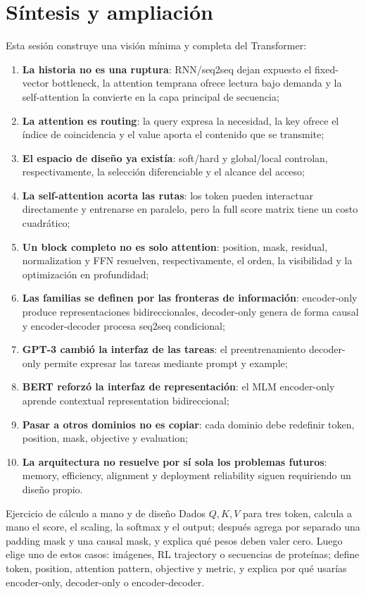 \section{Síntesis y ampliación}

Esta sesión construye una visión mínima y completa del Transformer:

\begin{enumerate}
  \item \textbf{La historia no es una ruptura}: RNN/seq2seq dejan expuesto el fixed-vector bottleneck, la attention temprana ofrece lectura bajo demanda y la self-attention la convierte en la capa principal de secuencia;
  \item \textbf{La attention es routing}: la query expresa la necesidad, la key ofrece el índice de coincidencia y el value aporta el contenido que se transmite;
  \item \textbf{El espacio de diseño ya existía}: soft/hard y global/local controlan, respectivamente, la selección diferenciable y el alcance del acceso;
  \item \textbf{La self-attention acorta las rutas}: los token pueden interactuar directamente y entrenarse en paralelo, pero la full score matrix tiene un costo cuadrático;
  \item \textbf{Un block completo no es solo attention}: position, mask, residual, normalization y FFN resuelven, respectivamente, el orden, la visibilidad y la optimización en profundidad;
  \item \textbf{Las familias se definen por las fronteras de información}: encoder-only produce representaciones bidireccionales, decoder-only genera de forma causal y encoder-decoder procesa seq2seq condicional;
  \item \textbf{GPT-3 cambió la interfaz de las tareas}: el preentrenamiento decoder-only permite expresar las tareas mediante prompt y example;
  \item \textbf{BERT reforzó la interfaz de representación}: el MLM encoder-only aprende contextual representation bidireccional;
  \item \textbf{Pasar a otros dominios no es copiar}: cada dominio debe redefinir token, position, mask, objective y evaluation;
  \item \textbf{La arquitectura no resuelve por sí sola los problemas futuros}: memory, efficiency, alignment y deployment reliability siguen requiriendo un diseño propio.
\end{enumerate}

\begin{importantbox}{Ejercicio de cálculo a mano y de diseño}
Dados $Q,K,V$ para tres token, calcula a mano el score, el scaling, la softmax y el output; después agrega por separado una padding mask y una causal mask, y explica qué pesos deben valer cero. Luego elige uno de estos casos: imágenes, RL trajectory o secuencias de proteínas; define token, position, attention pattern, objective y metric, y explica por qué usarías encoder-only, decoder-only o encoder-decoder.
\end{importantbox}

